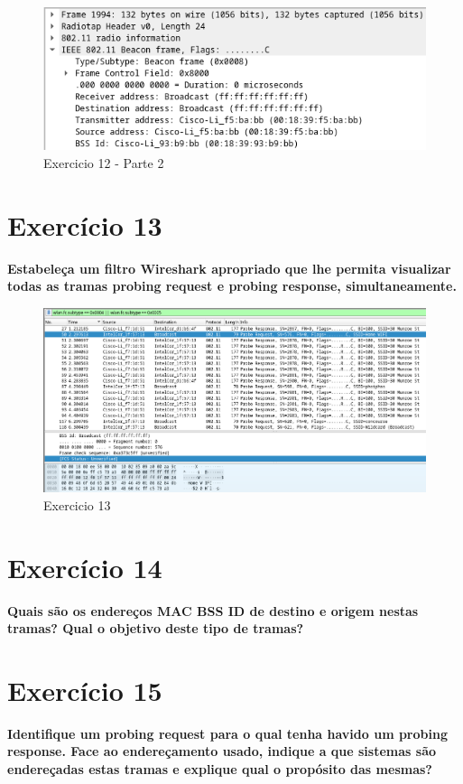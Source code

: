 \documentclass[a4paper]{report}
\begin{document}
\begin{figure}[H]
    \centering 
    \includegraphics[width=\textwidth]{images/ex12p2.png}  
    \caption{Exercicio 12 - Parte 2}
    \label{fig:ex12p2}
\end{figure}

\section{Exercício 13}
\textbf{Estabeleça um filtro Wireshark apropriado que lhe permita visualizar
    todas as tramas probing request e probing response, simultaneamente.}

\begin{figure}[H]
    \centering 
    \includegraphics[width=\textwidth]{images/ex13.png}  
    \caption{Exercicio 13}
    \label{fig:ex13}
\end{figure}

\section{Exercício 14}
\textbf{Quais são os endereços MAC BSS ID de destino e origem nestas tramas?
    Qual o objetivo deste tipo de tramas?}

\section{Exercício 15}
\textbf{Identifique um probing request para o qual tenha havido um probing
    response. Face ao endereçamento usado, indique a que sistemas são
    endereçadas estas tramas e explique qual o propósito das mesmas?}
\end{document}
